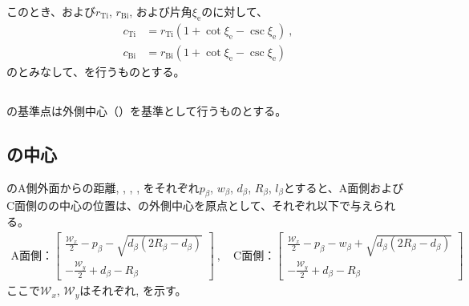 このとき、\TopEndFaceInRChamferRadius および\BottomFaceInRChamferRadius$r_\mathrm{Ti}$, $r_\mathrm{Bi}$, および片角$\xi_\mathrm e$の\TaperEndMill に対して、
\begin{align*}
  c_\mathrm{Ti} &= r_\mathrm{Ti}\left(1+\cot\xi_\mathrm e-\csc\xi_\mathrm e\right)\ ,\\
  c_\mathrm{Bi} &= r_\mathrm{Bi}\left(1+\cot\xi_\mathrm e-\csc\xi_\mathrm e\right)
\end{align*}
の\EndFaceCChamferLength とみなして、\EndFaceInCChamferMilling を行うものとする。



\clearpage


\subsection{\EndFaceBoringMillingReferencePoint}
\EndFaceBoringMilling の基準点は外側中心（\nameTopEndFace）を基準として行うものとする。


\subsection{\EndFaceBoringCornerR の中心}
\EndFaceBoring のA側外面からの距離, \EndFaceBoringWidth, \EndFaceBoringDepth, \EndFaceBoringCornerR, \EndFaceBoringLength をそれぞれ$p_\beta$, $w_\beta$, $d_\beta$, $R_\beta$, $l_\beta$とすると、A面側およびC面側の\EndFaceBoringCornerR の中心の位置は、\TopEndFace の外側中心を原点として、それぞれ以下で与えられる。
\begin{align*}
  \text{A面側：}
  \left[
  \begin{array}{c}
  \displaystyle
  \frac{\mathcal W_x}2-p_\beta-\sqrt{d_\beta(2R_\beta-d_\beta)}\\[8pt]
  \displaystyle
  -\frac{\mathcal W_y}2+d_\beta-R_\beta
  \end{array}
  \right]~,\quad
  \text{C面側：}
  \left[
  \begin{array}{c}
  \displaystyle
  \frac{\mathcal W_x}2-p_\beta-w_\beta+\sqrt{d_\beta(2R_\beta-d_\beta)}\\[8pt]
  \displaystyle
  -\frac{\mathcal W_y}2+d_\beta-R_\beta
  \end{array}
  \right]
\end{align*}
ここで$\mathcal W_x$, $\mathcal W_y$はそれぞれ\TopEndACOD, \TopEndBDOD を示す。


